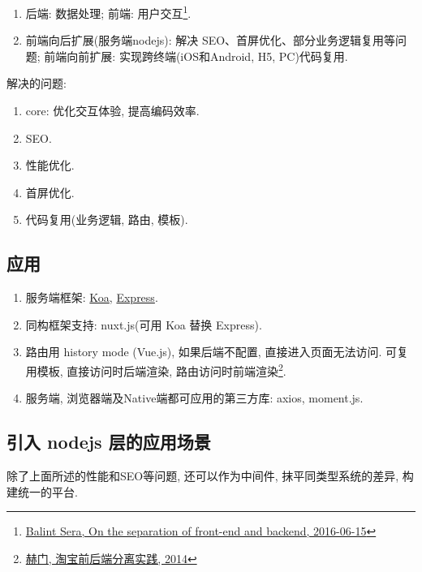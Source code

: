\begin{enumerate}
\def\labelenumi{\arabic{enumi}.}
\tightlist
\item
  后端: 数据处理; 前端: 用户交互\footnote{\href{https://medium.com/@balint_sera/on-the-separation-of-front-end-and-backend-7a0809b42820}{Balint
    Sera, On the separation of front-end and backend, 2016-06-15}}.
\item
  前端向后扩展(服务端nodejs): 解决
  SEO、首屏优化、部分业务逻辑复用等问题; 前端向前扩展:
  实现跨终端(iOS和Android, H5, PC)代码复用.
\end{enumerate}

解决的问题:

\begin{enumerate}
\def\labelenumi{\arabic{enumi}.}
\tightlist
\item
  core: 优化交互体验, 提高编码效率.
\item
  SEO.
\item
  性能优化.
\item
  首屏优化.
\item
  代码复用(业务逻辑, 路由, 模板).
\end{enumerate}

\subsection{应用}\label{ux5e94ux7528}

\begin{enumerate}
\def\labelenumi{\arabic{enumi}.}
\tightlist
\item
  服务端框架: \href{https://github.com/koajs/koa}{Koa},
  \href{https://github.com/expressjs/express}{Express}.
\item
  同构框架支持: nuxt.js(可用 Koa 替换 Express).
\item
  路由用 history mode (Vue.js), 如果后端不配置, 直接进入页面无法访问.
  可复用模板, 直接访问时后端渲染, 路由访问时前端渲染\footnote{\href{http://2014.jsconf.cn/slides/herman-taobaoweb/\#/}{赫门,
    淘宝前后端分离实践, 2014}}.
\item
  服务端, 浏览器端及Native端都可应用的第三方库: axios, moment.js.
\end{enumerate}

\subsection{引入 nodejs
层的应用场景}\label{ux5f15ux5165-nodejs-ux5c42ux7684ux5e94ux7528ux573aux666f}

除了上面所述的性能和SEO等问题, 还可以作为中间件, 抹平同类型系统的差异,
构建统一的平台.

